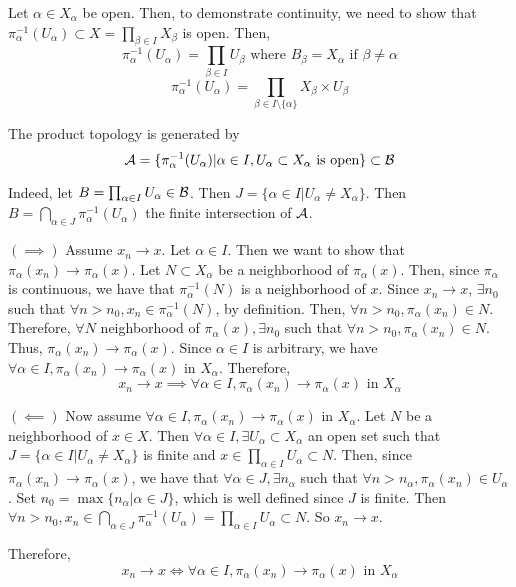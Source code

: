 \begin{myproof}
	Let $\alpha\in X_\alpha$ be open. Then, to demonstrate continuity, we need to show that $\displaystyle \pi_{\alpha}^{-1}(U_\alpha)\subset X = \prod_{\beta\in I}X_\beta$ is open. Then, 
	$$\pi_{\alpha}^{-1}(U_\alpha) = \prod_{\beta\in I} U_{\beta}\text{ where } B_\beta = X_\alpha \text{ if }\beta\neq \alpha$$
	$$\pi_{\alpha}^{-1}(U_\alpha) = \prod_{\beta\in I\setminus\{\alpha\}}X_\beta\times U_\beta$$
\end{myproof}

\begin{note}
	The product topology is generated by
	$$\mathcal{A} = \{\pi_\alpha^{-1}(U_\alpha)|\alpha\in I, U_\alpha\subset X_\alpha\text{ is open}\}\subset\mathcal{B}$$
\end{note}
Indeed, let $B = \prod_{\alpha\in I}U_\alpha\in\mathcal{B}$. Then $J = \{\alpha\in I| U_\alpha\neq X_\alpha\}$. Then $B = \bigcap_{\alpha\in J}\pi_{\alpha}^{-1}(U_\alpha)$ the finite intersection of $\mathcal{A}$.


\begin{myproof}
	$(\implies)$ Assume $x_n\to x$. Let $\alpha\in I$. Then we want to show that $\pi_{\alpha}(x_n)\to\pi_{\alpha}(x)$. Let $N\subset X_\alpha$ be a neighborhood of $\pi_{\alpha}(x)$. Then, since $\pi_\alpha$ is continuous, we have that $\pi_{\alpha}^{-1}(N)$ is a neighborhood of $x$. Since $x_n\to x$, $\exists n_0$ such that $\forall n > n_0, x_n\in\pi_{\alpha}^{-1}(N)$, by definition. Then, $\forall n>n_0, \pi_{\alpha}(x_n)\in N$. Therefore, $\forall N$ neighborhood of  $\pi_{\alpha}(x), \exists n_0$ such that $\forall n>n_0, \pi_{\alpha}(x_n)\in N$. Thus, $\pi_{\alpha}(x_n)\to\pi_{\alpha}(x)$. Since $\alpha \in I$ is arbitrary, we have $\forall \alpha\in I, \pi_{\alpha}(x_n)\to\pi_{\alpha}(x) \text{ in } X_\alpha$. Therefore,
	$$x_n\to x \implies \forall \alpha\in I, \pi_{\alpha}(x_n)\to\pi_{\alpha}(x) \text{ in } X_\alpha$$

	$(\impliedby)$ Now assume $\forall \alpha\in I, \pi_{\alpha}(x_n)\to\pi_{\alpha}(x) \text{ in } X_\alpha$. Let $N$ be a neighborhood of $x\in X$. Then $\forall\alpha\in I, \exists U_\alpha\subset X_\alpha$ an open set such that $J = \{\alpha\in I|U_\alpha\neq X_\alpha\}$ is finite and $x\in\prod_{\alpha\in I} U_\alpha\subset N$. Then, since $\pi_{\alpha}(x_n)\to \pi_{\alpha}(x)$, we have that  $\forall\alpha\in J, \exists n_\alpha$ such that $\forall n > n_\alpha, \pi_\alpha(x_n)\in U_\alpha$. Set $n_0 = \max\{n_\alpha|\alpha\in J\}$, which is well defined since $J$ is finite. Then $\forall n > n_0, x_n\in \bigcap_{\alpha\in J}\pi_{\alpha}^{-1}(U_\alpha) = \prod_{\alpha\in I}U_{\alpha}\subset N$. So $x_n\to x$.

	Therefore,
	$$x_n\to x \iff \forall \alpha\in I, \pi_{\alpha}(x_n)\to\pi_{\alpha}(x) \text{ in } X_\alpha$$
\end{myproof}

